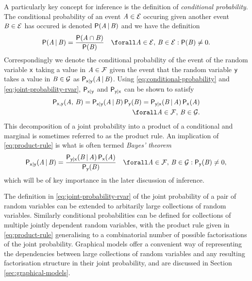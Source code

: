 A particularly key concept for inference is the definition of \emph{conditional probability}. The conditional probability of an event $\mathit{A} \in \mathcal{E}$ occuring given another event $\mathit{B} \in \mathcal{E}$ has occured is denoted $\mathsf{P}(\mathit{A} \operatorname{|} \mathit{B})$ and we have the definition
\begin{equation}\label{eq:conditional-probability}
  \probability(\set{A} \gvn \set{B}) =
  \frac{\probability(\set{A} \cap \set{B})}{\probability(\set{B})}
  \quad \forall \set{A} \in \sset{E},\,\set{B} \in \sset{E} : \probability(\set{B}) \neq 0.
\end{equation}
Correspondingly we denote the conditional probability of the event of the random variable $\mathsf{x}$ taking a value in $\mathit{A} \in \mathcal{F}$ given the event that the random variable $\mathsf{y}$ takes a value in $\mathit{B} \in \mathcal{G}$ as $\mathsf{P}_{\mathsf{x}|\mathsf{y}}(\mathit{A}\operatorname{|}\mathit{B})$. Using \eqref{eq:conditional-probability} and \eqref{eq:joint-probability-rvar}, $\mathsf{P}_{\mathsf{x}|\mathsf{y}}$ and $\mathsf{P}_{\mathsf{y}|\mathsf{x}}$ can be shown to satisfy
\begin{equation}\label{eq:product-rule}
\begin{split}
  \prob{\rvar{x},\rvar{y}}(\set{A},\,\set{B}) =
  \prob{\rvar{x}|\rvar{y}}(\set{A} \gvn \set{B}) \, \prob{\rvar{y}}(\set{B}) =
  \prob{\rvar{y}|\rvar{x}}(\set{B} \gvn \set{A}) \, \prob{\rvar{x}}(\set{A})\\
  \forall \set{A} \in \sset{F},\,\set{B} \in \sset{G}.
\end{split}
\end{equation}
This decomposition of a joint probability into a product of a conditional and marginal is sometimes referred to as the product rule. An implication of \eqref{eq:product-rule} is what is often termed \emph{Bayes' theorem}
\begin{equation}\label{eq:bayes-theorem}
\begin{split}
  \prob{\rvar{x}|\rvar{y}}(\set{A} \gvn \set{B}) =
  \frac
    {\prob{\rvar{y}|\rvar{x}}(\set{B} \gvn \set{A}) \, \prob{\rvar{x}}(\set{A})}
    {\prob{\rvar{y}}(\set{B})} 
  \quad
  \forall \set{A} \in \sset{F},\,
  \set{B} \in \sset{G} : \prob{\rvar{y}}(\set{B}) \neq 0,
\end{split}
\end{equation}
which will be of key importance in the later discussion of inference.

The definition in \eqref{eq:joint-probability-rvar} of the joint probability of a pair of random variables can be extended to arbitarily large collections of random variables. Similarly conditional probabilities can be defined for collections of multiple jointly dependent random variables, with the product rule given in \eqref{eq:product-rule} generalising to a combinatorial number of possible factorisations of the joint probability. Graphical models offer a convenient way of representing the dependencies between large collections of random variables and any resulting factorisation structure in their joint probability, and are discussed in Section \ref{sec:graphical-models}.

